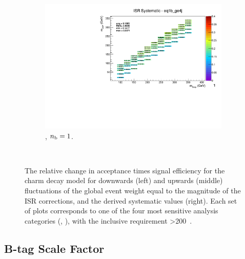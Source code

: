 \begin{figure}[ht!]
\begin{subfigure}[b]{0.32\textwidth}
    \includegraphics[width=\textwidth, page=1]{Figs/sms/t2cc/v37_3/systs/T2cc_ISR_eq1b_ge4j.pdf}
    \caption{\njhigh, $n_{\text{b}} = 1$.}
  \end{subfigure}\\
  \caption{The relative change in acceptance times signal efficiency for the
  charm decay model for downwards (left) and upwards (middle) fluctuations
  of the global event weight equal to the magnitude of the ISR corrections,
  and the derived systematic values (right). Each set of plots corresponds
  to one of the four most sensitive analysis categories (\nb, \nj), with the
  inclusive requirement \HT>200~\gev.}
  \label{fig:sms-isr-t2cc}
\end{figure}


\newpage
\subsection*{B-tag Scale Factor}
\label{sec:t2cc_btag_plots}

